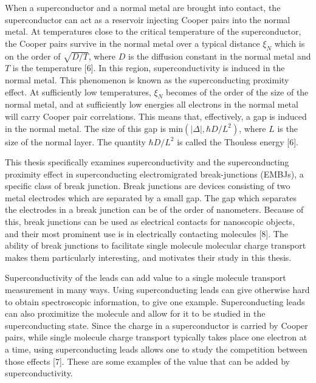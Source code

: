 When a superconductor and a normal metal are brought into contact, the superconductor can act as a reservoir injecting Cooper pairs into the normal metal. At temperatures close to the critical temperature of the superconductor, the Cooper pairs survive in the normal metal over a typical distance $\xi_N$ which is on the order of $\sqrt{D/T}$, where $D$ is the diffusion constant in the normal metal and $T$ is the temperature [6]. In this region, superconductivity is induced in the normal metal. This phenomenon is known as the superconducting proximity effect. At sufficiently low temperatures, $\xi_N$ becomes of the order of the size of the normal metal, and at sufficiently low energies all electrons in the normal metal will carry Cooper pair correlations. This means that, effectively, a gap is induced in the normal metal. The size of this gap is $\mathrm{min}\left(|\Delta|, \hbar D / L^2\right)$, where $L$ is the size of the normal layer. The quantity $\hbar D / L^2$ is called the Thouless energy [6].


\noindent This thesis specifically examines superconductivity and the superconducting proximity effect in superconducting electromigrated break-junctions (EMBJs), a specific class of break junction. Break junctions are devices consisting of two metal electrodes which are separated by a small gap. The gap which separates the electrodes in a break junction can be of the order of nanometers. Because of this, break junctions can be used as electrical contacts for nanoscopic objects, and their most prominent use is in electrically contacting molecules [8]. The ability of break junctions to facilitate single molecule molecular charge transport makes them particularly interesting, and motivates their study in this thesis. 

Superconductivity of the leads can add value to a single molecule transport measurement in many ways. Using superconducting leads can give otherwise hard to obtain spectroscopic information, to give one example. Superconducting leads can also proximitize the molecule and allow for it to be studied in the superconducting state. Since the charge in a superconductor is carried by Cooper pairs, while single molecule charge transport typically takes place one electron at a time, using superconducting leads allows one to study the competition between those effects [7]. These are some examples of the value that can be added by superconductivity.

